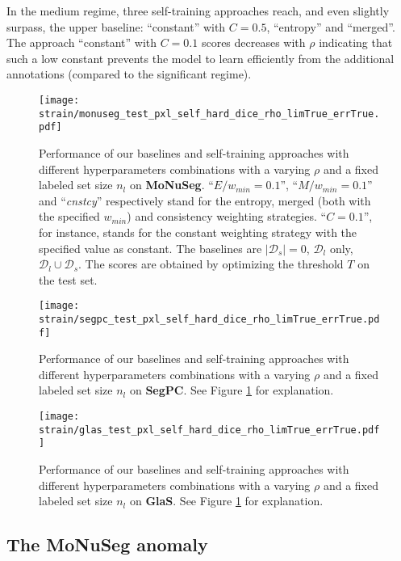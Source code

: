 In the medium regime, three self-training approaches reach, and even slightly surpass, the upper baseline: ``constant'' with $C = 0.5$, ``entropy'' and ``merged''. The approach ``constant'' with $C=0.1$ scores decreases with $\rho$ indicating that such a low constant prevents the model to learn efficiently from the additional annotations (compared to the significant regime).    


\begin{figure}
  \centering
  \texttt{[image: strain/monuseg\_test\_pxl\_self\_hard\_dice\_rho\_limTrue\_errTrue.pdf]}
  \caption{Performance of our baselines and self-training approaches with different hyperparameters combinations with a varying $\rho$ and a fixed labeled set size $n_l$ on \textbf{MoNuSeg}. ``$E / w_{min} = 0.1$'', ``$M / w_{min} = 0.1$'' and ``\textit{cnstcy}'' respectively stand for the entropy, merged (both with the specified $w_{min}$) and consistency weighting strategies. ``$C = 0.1$'', for instance, stands for the constant weighting strategy with the specified value as constant. The baselines are $|\mathcal{D}_s| = 0$, $\mathcal{D}_l$ only, $\mathcal{D}_l \cup \mathcal{D}_s$. The scores are obtained by optimizing the threshold $T$ on the test set.}
  \label{fig:strain:rho_exp_monuseg}
\end{figure}
\begin{figure}
  \centering
  \texttt{[image: strain/segpc\_test\_pxl\_self\_hard\_dice\_rho\_limTrue\_errTrue.pdf]}
  \caption{Performance of our baselines and self-training approaches with different hyperparameters combinations with a varying $\rho$ and a fixed labeled set size $n_l$ on \textbf{SegPC}. See Figure \ref{fig:strain:rho_exp_monuseg} for explanation.}
  \label{fig:strain:rho_exp_segpc}
\end{figure}
\begin{figure}
  \centering
  \texttt{[image: strain/glas\_test\_pxl\_self\_hard\_dice\_rho\_limTrue\_errTrue.pdf]}
  \caption{Performance of our baselines and self-training approaches with different hyperparameters combinations with a varying $\rho$ and a fixed labeled set size $n_l$ on \textbf{GlaS}. See Figure \ref{fig:strain:rho_exp_monuseg} for explanation.}
  \label{fig:strain:rho_exp_glas}
\end{figure}



\subsection{The MoNuSeg anomaly}




